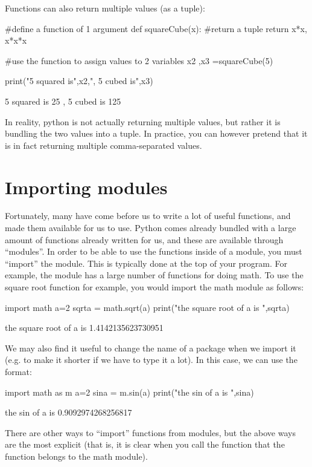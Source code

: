 Functions can also return multiple values (as a tuple):
\begin{python}[caption = Functions with multiple return values]
#define a function of 1 argument
def squareCube(x):
  #return a tuple
  return x*x, x*x*x

#use the function to assign values to 2 variables
x2 ,x3 =squareCube(5)

print("5 squared is",x2,", 5 cubed is",x3)
\end{python}
\begin{poutput}
5 squared is 25 , 5 cubed is 125
\end{poutput}
In reality, python is not actually returning multiple values, but rather it is bundling the two values into a tuple. In practice, you can however pretend that it is in fact returning multiple comma-separated values.

\section{Importing modules}
Fortunately, many have come before us to write a lot of useful functions, and made them available for us to use. Python comes already bundled with a large amount of functions already written for us, and these are available through ``modules''. In order to be able to use the functions inside of a module, you must ``import'' the module. This is typically done at the top of your program. For example, the  module has a large number of functions for doing math. To use the square root function for example, you would import the math module as follows:
\begin{python}[caption = Importing the math module]
import math
a=2
sqrta = math.sqrt(a)
print("the square root of a is ",sqrta)
\end{python}
\begin{poutput}
the square root of a is  1.4142135623730951
\end{poutput}
We may also find it useful to change the name of a package when we import it (e.g. to make it shorter if we have to type it a lot). In this case, we can use the  format:
\begin{python}[caption = Importing a module as]
import math as m
a=2
sina = m.sin(a)
print("the sin of a is ",sina)
\end{python}
\begin{poutput}
the sin of a is  0.9092974268256817
\end{poutput}
There are other ways to ``import'' functions from modules, but the above ways are the most explicit (that is, it is clear when you call the function  that the function belongs to the math module).

